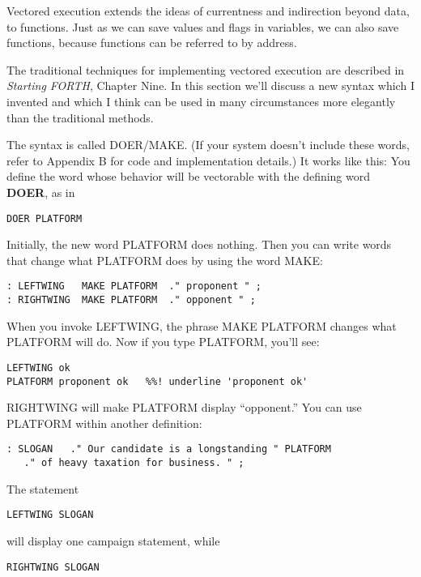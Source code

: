 Vectored execution extends the ideas of currentness and indirection
beyond data, to functions. Just as we can save values and flags in
variables, we can also save functions, because functions can be referred to
by address.

The traditional techniques for implementing vectored execution are
described in \emph{Starting FORTH}, Chapter Nine. In this section we'll
discuss a new syntax which I invented and which I think can be used in many
circumstances more elegantly than the traditional methods.

The syntax is called DOER/MAKE. (If your system doesn't include
these words, refer to Appendix B for code and implementation details.) It
works like this: You define the word whose behavior will be vectorable
with the defining word \textbf{DOER}, as in

\begin{verbatim}
DOER PLATFORM
\end{verbatim}

Initially, the new word PLATFORM does nothing. Then you can write
words that change what PLATFORM does by using the word MAKE:

\begin{verbatim}
: LEFTWING   MAKE PLATFORM  ." proponent " ;
: RIGHTWING  MAKE PLATFORM  ." opponent " ;
\end{verbatim}

When you invoke LEFTWING, the phrase MAKE PLATFORM changes
what PLATFORM will do. Now if you type PLATFORM, you'll see:

\begin{verbatim}
LEFTWING ok
PLATFORM proponent ok	%%! underline 'proponent ok'
\end{verbatim}

RIGHTWING will make PLATFORM display ``opponent.'' You can use
PLATFORM within another definition:

\begin{verbatim}
: SLOGAN   ." Our candidate is a longstanding " PLATFORM
   ." of heavy taxation for business. " ;
\end{verbatim}

The statement

\begin{verbatim}
LEFTWING SLOGAN
\end{verbatim}

will display one campaign statement, while

\begin{verbatim}
RIGHTWING SLOGAN
\end{verbatim}

